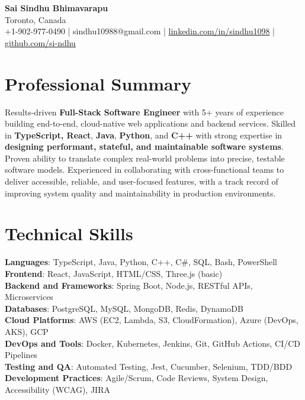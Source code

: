 \documentclass[letterpaper,11pt]{article}
\begin{document}
\begin{center}
  {\Large \textbf{Sai Sindhu Bhimavarapu}} \\
  Toronto, Canada \\
  +1-902-977-0490 \enspace | \enspace sindhu10988@gmail.com \enspace | \enspace \href{https://www.linkedin.com/in/sindhu1098/}{linkedin.com/in/sindhu1098} \enspace | \enspace \href{https://github.com/si-ndhu}{github.com/si-ndhu}
\end{center}

\section{Professional Summary}
  \begin{itemize}[leftmargin=0.15in, label={}]
    \small{\item{
     Results-driven \textbf{Full-Stack Software Engineer} with 5+ years of experience building end-to-end, cloud-native web applications and backend services. Skilled in \textbf{TypeScript, React}, \textbf{Java}, \textbf{Python}, and \textbf{C++} with strong expertise in \textbf{designing performant, stateful, and maintainable software systems}. Proven ability to translate complex real-world problems into precise, testable software models. Experienced in collaborating with cross-functional teams to deliver accessible, reliable, and user-focused features, with a track record of improving system quality and maintainability in production environments.
    }}
  \end{itemize}
\vspace{-16pt}

\section{Technical Skills}
 \begin{itemize}[leftmargin=0.15in, label={}]
    \small{\item{
     \textbf{Languages}: TypeScript, Java, Python, C++, C\#, SQL, Bash, PowerShell \\
     \textbf{Frontend}: React, JavaScript, HTML/CSS, Three.js (basic) \\
     \textbf{Backend and Frameworks}: Spring Boot, Node.js, RESTful APIs, Microservices \\
     \textbf{Databases}: PostgreSQL, MySQL, MongoDB, Redis, DynamoDB \\
     \textbf{Cloud Platforms}: AWS (EC2, Lambda, S3, CloudFormation), Azure (DevOps, AKS), GCP \\
     \textbf{DevOps and Tools}: Docker, Kubernetes, Jenkins, Git, GitHub Actions, CI/CD Pipelines \\
     \textbf{Testing and QA}: Automated Testing, Jest, Cucumber, Selenium, TDD/BDD \\
     \textbf{Development Practices}: Agile/Scrum, Code Reviews, System Design, Accessibility (WCAG), JIRA
    }}
 \end{itemize}
\vspace{-16pt}
\end{document}
